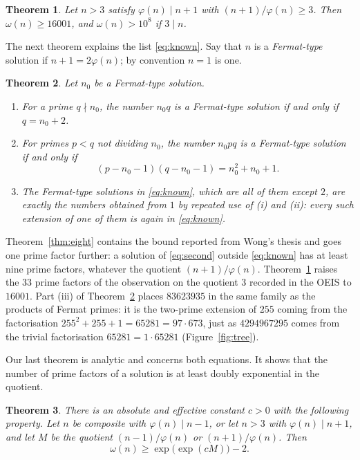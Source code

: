 \documentclass[11pt,reqno]{amsart}
\numberwithin{equation}{section}
\theoremstyle{plain}
\newtheorem{theorem}{Theorem}[section]
\theoremstyle{definition}
\theoremstyle{remark}
\begin{document}
\begin{theorem}\label{thm:quotient}
Let $n>3$ satisfy $\varphi(n)\mid n+1$ with $(n+1)/\varphi(n)\ge3$.
Then $\omega(n)\ge16001$, and $\omega(n)>10^8$ if $3\mid n$.
\end{theorem}

The next theorem explains the list \eqref{eq:known}. Say that $n$ is a
\emph{Fermat-type} solution if $n+1=2\varphi(n)$; by convention $n=1$
is one.

\begin{theorem}\label{thm:ext}
Let $n_0$ be a Fermat-type solution.
\begin{enumerate}[label=\textup{(\roman*)}]
\item For a prime $q\nmid n_0$, the number $n_0q$ is a Fermat-type
  solution if and only if $q=n_0+2$.
\item For primes $p<q$ not dividing $n_0$, the number $n_0pq$ is a
  Fermat-type solution if and only if
  \[
    (p-n_0-1)(q-n_0-1)=n_0^2+n_0+1 .
  \]
\item The Fermat-type solutions in \eqref{eq:known}, which are all
  of them except $2$, are exactly the numbers obtained from $1$ by
  repeated use of \textup{(i)} and \textup{(ii)}: every such extension
  of one of them is again in \eqref{eq:known}.
\end{enumerate}
\end{theorem}

Theorem~\ref{thm:eight} contains the bound reported from Wong's
thesis and goes one prime factor further: a solution of
\eqref{eq:second} outside \eqref{eq:known} has at least nine prime
factors, whatever the quotient $(n+1)/\varphi(n)$. Theorem~\ref{thm:quotient}
raises the $33$ prime factors of the observation on the quotient $3$
recorded in the OEIS to $16001$. Part (iii) of
Theorem~\ref{thm:ext} places $83623935$ in the same family as the
products of Fermat primes: it is the two-prime extension of $255$
coming from the factorisation $255^2+255+1=65281=97\cdot673$, just as
$4294967295$ comes from the trivial factorisation $65281=1\cdot65281$
(Figure~\ref{fig:tree}).

Our last theorem is analytic and concerns both equations. It shows
that the number of prime factors of a solution is at least doubly
exponential in the quotient.

\begin{theorem}\label{thm:doubly}
There is an absolute and effective constant $c>0$ with the following
property. Let $n$ be composite with $\varphi(n)\mid n-1$, or let $n>3$
with $\varphi(n)\mid n+1$, and let $M$ be the quotient
$(n-1)/\varphi(n)$ or $(n+1)/\varphi(n)$. Then
\[
  \omega(n)\ge\exp\bigl(\exp(cM)\bigr)-2 .
\]
\end{theorem}
\end{document}

